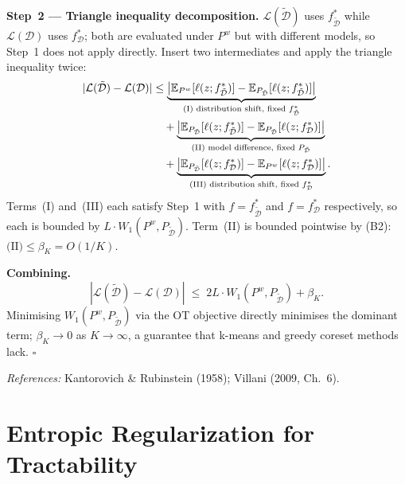 \textbf{Step~2 --- Triangle inequality decomposition.}
$\mathcal{L}(\tilde{\mathcal{D}})$ uses $f^*_{\tilde{\mathcal{D}}}$ while $\mathcal{L}(\mathcal{D})$ uses $f^*_\mathcal{D}$; both are evaluated under $P^w$ but with different models, so Step~1 does not apply directly.
Insert two intermediates and apply the triangle inequality twice:
\begin{align}
    |\mathcal{L}(\tilde{\mathcal{D}}) - \mathcal{L}(\mathcal{D})|
    &\leq
    \underbrace{
        \left|
            \mathbb{E}_{P^w}[\ell(z;f^*_{\tilde{\mathcal{D}}})]
            - \mathbb{E}_{P_{\tilde{\mathcal{D}}}}[\ell(z;f^*_{\tilde{\mathcal{D}}})]
        \right|
    }_{\text{(I) distribution shift, fixed }f^*_{\tilde{\mathcal{D}}}} \notag \\
    &\quad +
    \underbrace{
        \left|
            \mathbb{E}_{P_{\tilde{\mathcal{D}}}}[\ell(z;f^*_{\tilde{\mathcal{D}}})]
            - \mathbb{E}_{P_{\tilde{\mathcal{D}}}}[\ell(z;f^*_\mathcal{D})]
        \right|
    }_{\text{(II) model difference, fixed }P_{\tilde{\mathcal{D}}}} \notag \\
    &\quad +
    \underbrace{
        \left|
            \mathbb{E}_{P_{\tilde{\mathcal{D}}}}[\ell(z;f^*_\mathcal{D})]
            - \mathbb{E}_{P^w}[\ell(z;f^*_\mathcal{D})]
        \right|
    }_{\text{(III) distribution shift, fixed }f^*_\mathcal{D}}.
\end{align}
Terms~(I) and~(III) each satisfy Step~1 with $f = f^*_{\tilde{\mathcal{D}}}$ and $f = f^*_\mathcal{D}$ respectively, so each is bounded by $L \cdot W_1(P^w, P_{\tilde{\mathcal{D}}})$.
Term~(II) is bounded pointwise by (B2): $\text{(II)} \leq \beta_K = O(1/K)$.

\textbf{Combining.}
\begin{equation}
    |\mathcal{L}(\tilde{\mathcal{D}}) - \mathcal{L}(\mathcal{D})|
    \;\leq\; 2L \cdot W_1(P^w, P_{\tilde{\mathcal{D}}}) + \beta_K.
\end{equation}
Minimising $W_1(P^w, P_{\tilde{\mathcal{D}}})$ via the OT objective directly minimises the dominant term; $\beta_K \to 0$ as $K \to \infty$, a guarantee that k-means and greedy coreset methods lack. $\square$

\noindent\textit{References:} Kantorovich \& Rubinstein (1958); Villani (2009, Ch.~6).


\section{Entropic Regularization for Tractability}
\label{ch5:app:method}

